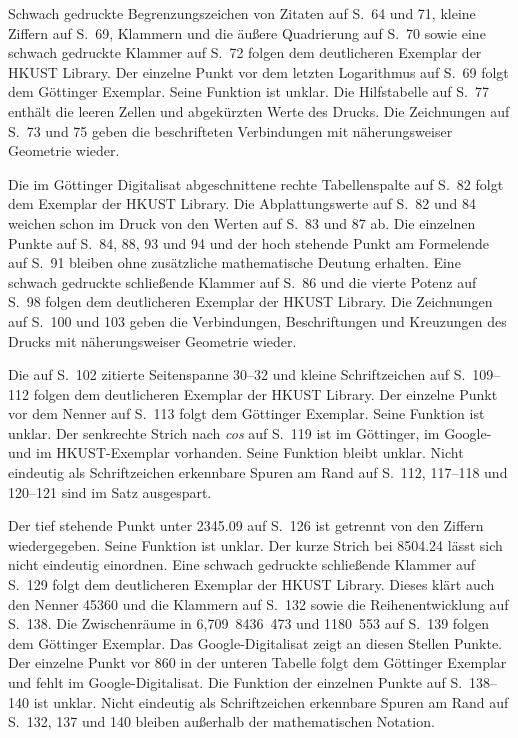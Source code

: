 Schwach gedruckte Begrenzungszeichen von Zitaten auf S.~64 und 71,
kleine Ziffern auf S.~69, Klammern und die äußere Quadrierung auf
S.~70 sowie eine schwach gedruckte Klammer auf S.~72 folgen dem
deutlicheren Exemplar der HKUST Library. Der einzelne Punkt vor dem
letzten Logarithmus auf S.~69 folgt dem Göttinger Exemplar. Seine
Funktion ist unklar. Die Hilfstabelle auf S.~77 enthält die leeren
Zellen und abgekürzten Werte des Drucks. Die Zeichnungen auf S.~73
und 75 geben die beschrifteten Verbindungen mit näherungsweiser
Geometrie wieder.

Die im Göttinger Digitalisat abgeschnittene rechte Tabellenspalte
auf S.~82 folgt dem Exemplar der HKUST Library. Die Abplattungswerte
auf S.~82 und 84 weichen schon im Druck von den Werten auf S.~83
und 87 ab. Die einzelnen Punkte auf S.~84, 88, 93 und 94 und der
hoch stehende Punkt am Formelende auf S.~91 bleiben ohne zusätzliche
mathematische Deutung erhalten. Eine schwach gedruckte schließende
Klammer auf S.~86 und die vierte Potenz auf S.~98 folgen dem
deutlicheren Exemplar der HKUST Library. Die Zeichnungen auf S.~100
und 103 geben die Verbindungen, Beschriftungen und Kreuzungen des
Drucks mit näherungsweiser Geometrie wieder.

Die auf S.~102 zitierte Seitenspanne 30--32 und kleine
Schriftzeichen auf S.~109--112 folgen dem deutlicheren Exemplar der
HKUST Library. Der einzelne Punkt vor dem Nenner auf S.~113 folgt
dem Göttinger Exemplar. Seine Funktion ist unklar. Der senkrechte
Strich nach \emph{cos} auf S.~119 ist im Göttinger, im Google- und
im HKUST-Exemplar vorhanden. Seine Funktion bleibt unklar. Nicht
eindeutig als Schriftzeichen erkennbare Spuren am Rand auf S.~112,
117--118 und 120--121 sind im Satz ausgespart.

Der tief stehende Punkt unter \mbox{2345.09} auf S.~126 ist getrennt
von den Ziffern wiedergegeben. Seine Funktion ist unklar. Der kurze
Strich bei \mbox{8504.24} lässt sich nicht eindeutig einordnen.
Eine schwach gedruckte schließende Klammer auf S.~129 folgt dem
deutlicheren Exemplar der HKUST Library. Dieses klärt auch den Nenner
45360 und die Klammern auf S.~132 sowie die Reihenentwicklung auf
S.~138. Die Zwischenräume in \mbox{6,709 8436 473} und
\mbox{1180 553} auf S.~139 folgen dem Göttinger Exemplar. Das
Google-Digitalisat zeigt an diesen Stellen Punkte. Der einzelne
Punkt vor 860 in der unteren Tabelle folgt dem Göttinger Exemplar
und fehlt im Google-Digitalisat. Die Funktion der einzelnen Punkte
auf S.~138--140 ist unklar. Nicht eindeutig als Schriftzeichen
erkennbare Spuren am Rand auf S.~132, 137 und 140 bleiben außerhalb
der mathematischen Notation.

